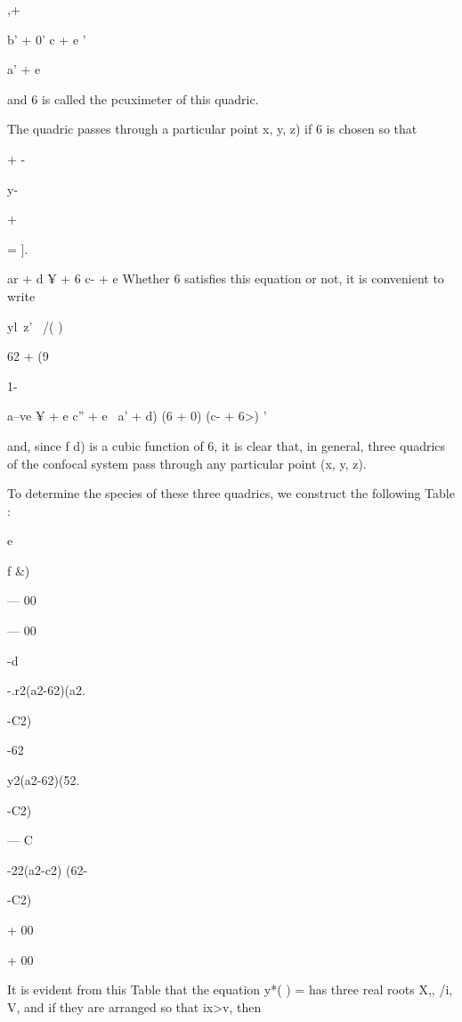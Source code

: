 {{,+



b' + 0' c + e '



a' + e

and 6 is called the pcuximeter of this quadric.

The quadric passes through a particular point x, y, z) if 6 is chosen
so that



+ -



y-



+



= ].



ar + d ¥ + 6 c- + e Whether 6 satisfies this equation or not, it is
convenient to write

  yl\ z' \ /( )

62 + (9



1-



a--ve ¥ + e c'' + e~ a' + d) (6 + 0) (c- + 6>) '

and, since f d) is a cubic function of 6, it is clear that, in
general, three quadrics of the confocal system pass through any
particular point (x, y, z).

To determine the species of these three quadrics, we construct the
following Table :



e


f \&)


— 00


— 00




-d


-.r2(a2-62)(a2.


-C2)


-62


y2(a2-62)(52.


-C2)


— C


-22(a2-c2) (62-


-C2)


+ 00


+ 00





It is evident from this Table that the equation y*( ) = has three real
roots X,, /i, V, and if they are arranged so that ix>v, then

}}
